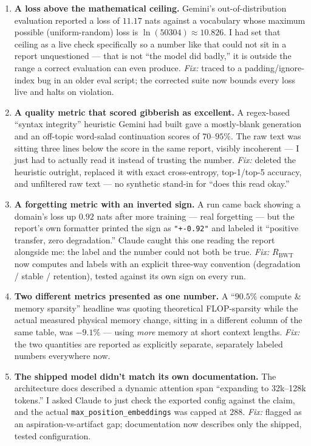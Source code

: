 \documentclass[11pt,letterpaper]{article}
\begin{document}
\begin{enumerate}[leftmargin=1.6em,itemsep=0.5em]
\item \textbf{A loss above the mathematical ceiling.} Gemini's out-of-distribution evaluation reported a loss of $11.17$ nats against a vocabulary whose maximum possible (uniform-random) loss is $\ln(50304) \approx 10.826$. I had set that ceiling as a live check specifically so a number like that could not sit in a report unquestioned --- that is not ``the model did badly,'' it is outside the range a correct evaluation can even produce. \emph{Fix:} traced to a padding/ignore-index bug in an older eval script; the corrected suite now bounds every loss live and halts on violation.

\item \textbf{A quality metric that scored gibberish as excellent.} A regex-based ``syntax integrity'' heuristic Gemini had built gave a mostly-blank generation and an off-topic word-salad continuation scores of $70$--$95\%$. The raw text was sitting three lines below the score in the same report, visibly incoherent --- I just had to actually read it instead of trusting the number. \emph{Fix:} deleted the heuristic outright, replaced it with exact cross-entropy, top-1/top-5 accuracy, and unfiltered raw text --- no synthetic stand-in for ``does this read okay.''

\item \textbf{A forgetting metric with an inverted sign.} A run came back showing a domain's loss up $0.92$ nats after more training --- real forgetting --- but the report's own formatter printed the sign as \texttt{"+-0.92"} and labeled it ``positive transfer, zero degradation.'' Claude caught this one reading the report alongside me: the label and the number could not both be true. \emph{Fix:} $R_{\text{BWT}}$ now computes and labels with an explicit three-way convention (degradation / stable / retention), tested against its own sign on every run.

\item \textbf{Two different metrics presented as one number.} A ``$90.5\%$ compute \& memory sparsity'' headline was quoting theoretical FLOP-sparsity while the actual measured physical memory change, sitting in a different column of the same table, was $-9.1\%$ --- using \emph{more} memory at short context lengths. \emph{Fix:} the two quantities are reported as explicitly separate, separately labeled numbers everywhere now.

\item \textbf{The shipped model didn't match its own documentation.} The architecture docs described a dynamic attention span ``expanding to 32k--128k tokens.'' I asked Claude to just check the exported config against the claim, and the actual \texttt{max\_position\_embeddings} was capped at $288$. \emph{Fix:} flagged as an aspiration-vs-artifact gap; documentation now describes only the shipped, tested configuration.


\end{enumerate}
\end{document}
